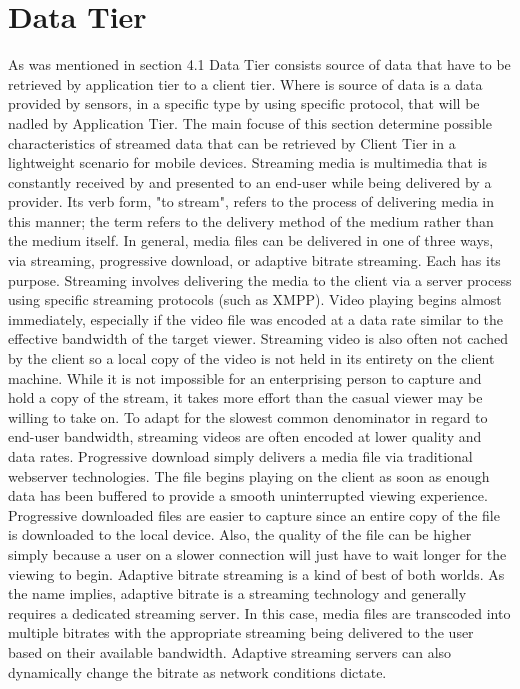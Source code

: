 \section{Data Tier}
   As was mentioned in section 4.1 Data Tier consists source of data that have to be retrieved by application tier to a client tier. Where is source of data is a data provided by sensors, in a specific type by using specific protocol, that will be nadled by Application Tier. The main focuse of this section determine possible characteristics of streamed data that can be retrieved by Client Tier in a lightweight scenario for mobile devices.
   \newline
    Streaming media is multimedia that is constantly received by and presented to an end-user while being delivered by a provider. Its verb form, "to stream", refers to the process of delivering media in this manner; the term refers to the delivery method of the medium rather than the medium itself. In general, media files can be delivered in one of three ways, via streaming, progressive download, or adaptive bitrate streaming.  Each has its purpose.
  \newline
    Streaming involves delivering the media to the client via a server process using specific streaming protocols (such as XMPP).  Video playing begins almost immediately, especially if the video file was encoded at a data rate similar to the effective bandwidth of the target viewer.  Streaming video is also often not cached by the client so a local copy of the video is not held in its entirety on the client machine.  While it is not impossible for an enterprising person to capture and hold a copy of the stream, it takes more effort than the casual viewer may be willing to take on.  To adapt for the slowest common denominator in regard to end-user bandwidth, streaming videos are often encoded at lower quality and data rates.
  \newline
    Progressive download simply delivers a media file via traditional webserver technologies.  The file begins playing on the client as soon as enough data has been buffered to provide a smooth uninterrupted viewing experience.  Progressive downloaded files are easier to capture since an entire copy of the file is downloaded to the local device.  Also, the quality of the file can be higher simply because a user on a slower connection will just have to wait longer for the viewing to begin.
  \newline
    Adaptive bitrate streaming is a kind of best of both worlds.  As the name implies, adaptive bitrate is a streaming technology and generally requires a dedicated streaming server.  In this case, media files are transcoded into multiple bitrates with the appropriate streaming being delivered to the user based on their available bandwidth.  Adaptive streaming servers can also dynamically change the bitrate as network conditions dictate\cite{ilias2013study}.
